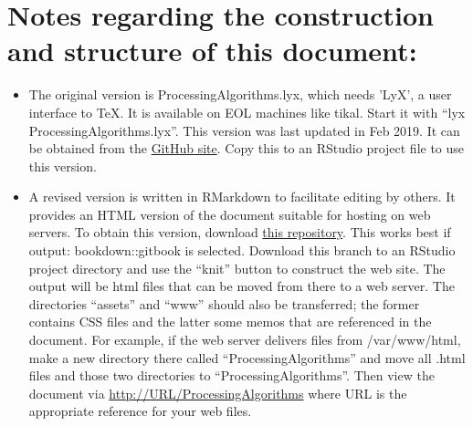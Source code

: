 \documentclass[
]{book}
\providecommand{\tightlist}{%
  \setlength{\itemsep}{0pt}\setlength{\parskip}{0pt}}
\begin{document}
\hypertarget{notes-regarding-the-construction-and-structure-of-this-document}{%
\section*{Notes regarding the construction and structure of this document:}\label{notes-regarding-the-construction-and-structure-of-this-document}}

\begin{itemize}
\tightlist
\item
  The original version is ProcessingAlgorithms.lyx, which needs 'LyX', a user interface to TeX. It is available on EOL machines like tikal. Start it with ``lyx ProcessingAlgorithms.lyx''. This version
  was last updated in Feb 2019. It can be obtained from the \href{https://github.com/WilliamCooper/ProcessingAlgorithms}{GitHub site}. Copy this to an RStudio project file to use this version.\\
\item
  A revised version is written in RMarkdown to facilitate editing by others. It provides an HTML version of the document suitable for hosting on web servers. To obtain this version, download \href{https://github.com/WilliamCooper/ProcessingAlgorithms/tree/Rmd}{this repository}. This works best
  if output: bookdown::gitbook is selected. Download this branch to an RStudio project directory and use the ``knit'' button to construct the web site. The output will be html files that can be moved from there to a web server. The directories ``assets'' and ``www'' should also be transferred; the former contains CSS files and the latter some memos that are referenced in the document. For example, if the web server delivers files from /var/www/html, make a new
  directory there called ``ProcessingAlgorithms'' and move all .html files and those two directories to ``ProcessingAlgorithms''.
  Then view the document via \url{http://URL/ProcessingAlgorithms} where URL is the appropriate reference for
  your web files.


\end{itemize}
\end{document}

